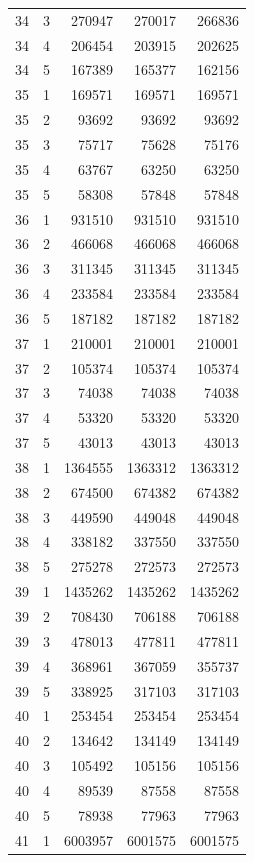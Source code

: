 \begin{longtable}{rrrrr}
34 & 3 & 270947 & 270017 & 266836 \\
34 & 4 & 206454 & 203915 & 202625 \\
34 & 5 & 167389 & 165377 & 162156 \\
35 & 1 & 169571 & 169571 & 169571 \\
35 & 2 & 93692 & 93692 & 93692 \\
35 & 3 & 75717 & 75628 & 75176 \\
35 & 4 & 63767 & 63250 & 63250 \\
35 & 5 & 58308 & 57848 & 57848 \\
36 & 1 & 931510 & 931510 & 931510 \\
36 & 2 & 466068 & 466068 & 466068 \\
36 & 3 & 311345 & 311345 & 311345 \\
36 & 4 & 233584 & 233584 & 233584 \\
36 & 5 & 187182 & 187182 & 187182 \\
37 & 1 & 210001 & 210001 & 210001 \\
37 & 2 & 105374 & 105374 & 105374 \\
37 & 3 & 74038 & 74038 & 74038 \\
37 & 4 & 53320 & 53320 & 53320 \\
37 & 5 & 43013 & 43013 & 43013 \\
38 & 1 & 1364555 & 1363312 & 1363312 \\
38 & 2 & 674500 & 674382 & 674382 \\
38 & 3 & 449590 & 449048 & 449048 \\
38 & 4 & 338182 & 337550 & 337550 \\
38 & 5 & 275278 & 272573 & 272573 \\
39 & 1 & 1435262 & 1435262 & 1435262 \\
39 & 2 & 708430 & 706188 & 706188 \\
39 & 3 & 478013 & 477811 & 477811 \\
39 & 4 & 368961 & 367059 & 355737 \\
39 & 5 & 338925 & 317103 & 317103 \\
40 & 1 & 253454 & 253454 & 253454 \\
40 & 2 & 134642 & 134149 & 134149 \\
40 & 3 & 105492 & 105156 & 105156 \\
40 & 4 & 89539 & 87558 & 87558 \\
40 & 5 & 78938 & 77963 & 77963 \\
41 & 1 & 6003957 & 6001575 & 6001575 \\

\end{longtable}
